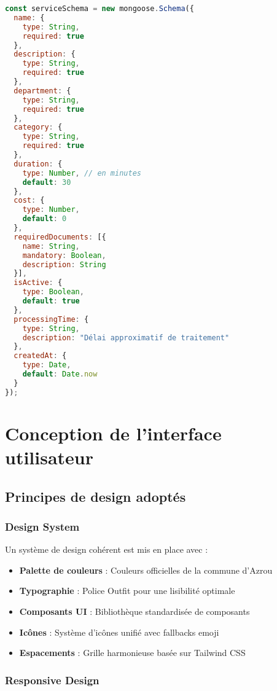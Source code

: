 \begin{lstlisting}[language=JavaScript, caption=Schéma MongoDB pour les services]
const serviceSchema = new mongoose.Schema({
  name: {
    type: String,
    required: true
  },
  description: {
    type: String,
    required: true
  },
  department: {
    type: String,
    required: true
  },
  category: {
    type: String,
    required: true
  },
  duration: {
    type: Number, // en minutes
    default: 30
  },
  cost: {
    type: Number,
    default: 0
  },
  requiredDocuments: [{
    name: String,
    mandatory: Boolean,
    description: String
  }],
  isActive: {
    type: Boolean,
    default: true
  },
  processingTime: {
    type: String,
    description: "Délai approximatif de traitement"
  },
  createdAt: {
    type: Date,
    default: Date.now
  }
});
\end{lstlisting}

\section{Conception de l'interface utilisateur}

\subsection{Principes de design adoptés}

\subsubsection{Design System}

Un système de design cohérent est mis en place avec :

\begin{itemize}
\item \textbf{Palette de couleurs} : Couleurs officielles de la commune d'Azrou
\item \textbf{Typographie} : Police Outfit pour une lisibilité optimale
\item \textbf{Composants UI} : Bibliothèque standardisée de composants
\item \textbf{Icônes} : Système d'icônes unifié avec fallbacks emoji
\item \textbf{Espacements} : Grille harmonieuse basée sur Tailwind CSS
\end{itemize}

\subsubsection{Responsive Design}


